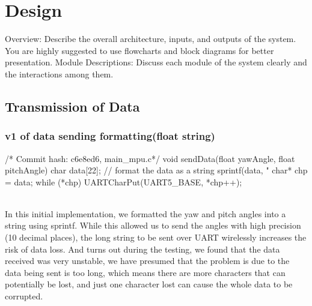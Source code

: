 \documentclass[12pt, a4paper]{article}
\begin{document}
\section{Design}
Overview: Describe the overall architecture, inputs, and outputs of the
system.
You are highly suggested to use flowcharts and block diagrams for
better presentation.
Module Descriptions: Discuss each module of the system clearly and
the interactions among them.

\subsection{Transmission of Data}
\subsubsection{v1 of data sending formatting(float string)}\text{}
\begin{code}
/* Commit hash: c6e8ed6, main_mpu.c*/
void sendData(float yawAngle, float pitchAngle) {
    char data[22];
    // format the data as a string
    sprintf(data, "%
    char* chp = data;
    while (*chp) 
        UARTCharPut(UART5_BASE, *chp++);
}
\end{code}\text{}\\
In this initial implementation, we formatted the yaw and pitch angles into a string using sprintf. 
While this allowed us to send the angles with high precision (10 decimal places), 
the long string to be sent over UART wirelessly increases the risk of data loss. And turns out during the testing, 
we found that the data received was very unstable, we have presumed that the problem is due to the data being sent is too long, 
which means there are more characters that can potentially be lost, and just one character lost can cause the whole data to be corrupted.
\end{document}
